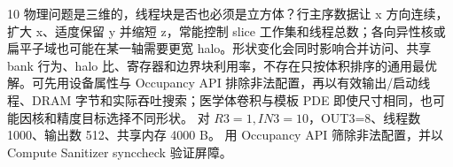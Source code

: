 \begin{solutionexercise}{10}
物理问题是三维的，线程块是否也必须是立方体？行主序数据让 x 方向连续，扩大 x、适度保留 y 并缩短 z，常能控制 slice 工作集和线程总数；各向异性核或扁平子域也可能在某一轴需要更宽 halo。形状变化会同时影响合并访问、共享 bank 行为、halo 比、寄存器和边界块利用率，不存在只按体积排序的通用最优解。可先用设备属性与 Occupancy API 排除非法配置，再以有效输出/启动线程、DRAM 字节和实际吞吐搜索；医学体卷积与模板 PDE 即使尺寸相同，也可能因核和精度目标选择不同形状。
\variantheading 对 $R3=1,IN3=10$，OUT3=8、线程数 1000、输出数 512、共享内存 4000 B。
\practiceheading 用 Occupancy API 筛除非法配置，并以 Compute Sanitizer synccheck 验证屏障。
\end{solutionexercise}

